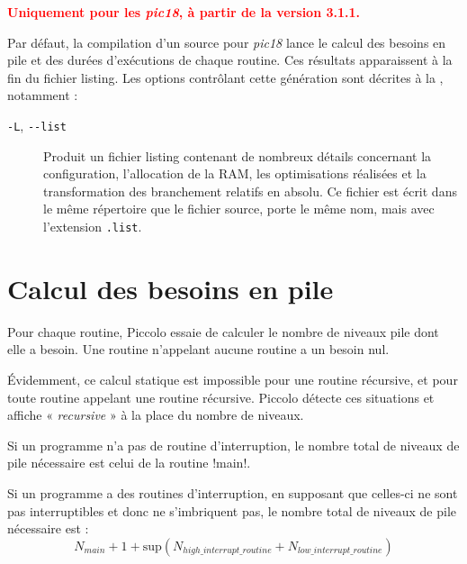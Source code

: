 


\thispagestyle{empty}

\textcolor{red}{\bf Uniquement pour les \emph{pic18}, à partir de la version 3.1.1.}

Par défaut, la compilation d'un source pour \emph{pic18} lance le calcul des besoins en pile et des durées d'exécutions de chaque routine. Ces résultats apparaissent à la fin du fichier listing. Les options contrôlant cette génération sont décrites à la , notamment :
\begin{description}

  \item[\texttt{-L}, \texttt{-{-}list}] Produit un fichier listing contenant de nombreux détails concernant la configuration, l’allocation de la RAM, les optimisations réalisées et la transformation des branchement relatifs en absolu. Ce fichier est écrit dans le même répertoire que le fichier source, porte le même nom, mais avec l’extension \texttt{.list}.
\end{description}

\section{Calcul des besoins en pile}

Pour chaque routine, Piccolo essaie de calculer le nombre de niveaux pile dont elle a besoin. Une routine n'appelant aucune routine a un besoin nul.

Évidemment, ce calcul statique est impossible pour une routine récursive, et pour toute routine appelant une routine récursive. Piccolo détecte ces situations et affiche « \emph{recursive} » à la place du nombre de niveaux. 

Si un programme n'a pas de routine d'interruption, le nombre total de niveaux de pile nécessaire est celui de la routine \pic!main!.


Si un programme a des routines d'interruption, en supposant que celles-ci ne sont pas interruptibles et donc ne s'imbriquent pas, le nombre total de niveaux de pile nécessaire est :
\begin{equation}
  N_{main} + 1 + \text{sup} \left(N_{high\_interrupt\_routine} + N_{low\_interrupt\_routine}\right)
\end{equation}

